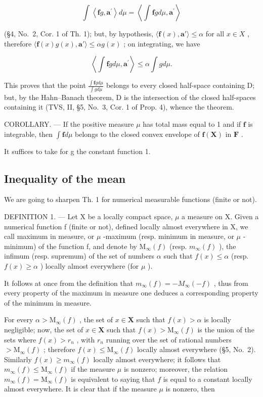 \[
\int \left\langle \mathbf {f} g, \mathbf {a} ^ {\prime} \right\rangle d \mu = \left\langle \int \mathbf {f} g d \mu , \mathbf {a} ^ {\prime} \right\rangle
\]

(§4, No.~2, Cor. 1 of Th. 1); but, by hypothesis, \(\langle \mathbf{f}(x), \mathbf{a}' \rangle \leqslant \alpha\) for all \(x \in X\) , therefore \(\langle \mathbf{f}(x)g(x), \mathbf{a}' \rangle \leqslant \alpha g(x)\) ; on integrating, we have

\[
\left\langle \int \mathbf {f} g d \mu , \mathbf {a} ^ {\prime} \right\rangle \leqslant \alpha \int g d \mu .
\]

This proves that the point \(\frac{\int\mathbf{f}g d\mu}{\int g d\mu}\) belongs to every closed half-space containing D; but, by the Hahn--Banach theorem, D is the intersection of the closed half-spaces containing it (TVS, II, §5, No.~3, Cor. 1 of Prop. 4), whence the theorem.

COROLLARY. --- If the positive measure \(\mu\) has total mass equal to 1 and if \(\mathbf{f}\) is integrable, then \(\int \mathbf{f} d\mu\) belongs to the closed convex envelope of \(\mathbf{f}(\mathbf{X})\) in \(\mathbf{F}\) .

It suffices to take for g the constant function 1.

\subsection{Inequality of the mean}

We are going to sharpen Th. 1 for numerical measurable functions (finite or not).

DEFINITION 1. --- Let X be a locally compact space, \(\mu\) a measure on X. Given a numerical function f (finite or not), defined locally almost everywhere in X, we call maximum in measure, or \(\mu\) -maximum (resp. minimum in measure, or \(\mu\) -minimum) of the function f, and denote by \(\mathrm{M}_{\infty}(f)\) (resp. \(m_{\infty}(f)\) ), the infimum (resp. supremum) of the set of numbers \(\alpha\) such that \(f(x) \leqslant \alpha\) (resp. \(f(x) \geqslant \alpha\) ) locally almost everywhere (for \(\mu\) ).

It follows at once from the definition that \(m_{\infty}(f) = -M_{\infty}(-f)\) , thus from every property of the maximum in measure one deduces a corresponding property of the minimum in measure.

For every \(\alpha > \mathrm{M}_{\infty}(f)\) , the set of \(x \in \mathbf{X}\) such that \(f(x) > \alpha\) is locally negligible; now, the set of \(x \in \mathbf{X}\) such that \(f(x) > \mathrm{M}_{\infty}(f)\) is the union of the sets where \(f(x) > r_n\) , with \(r_n\) running over the set of rational numbers \(> \mathrm{M}_{\infty}(f)\) ; therefore \(f(x) \leqslant \mathrm{M}_{\infty}(f)\) locally almost everywhere (§5, No.~2). Similarly \(f(x) \geqslant m_{\infty}(f)\) locally almost everywhere; it follows that \(m_{\infty}(f) \leqslant \mathrm{M}_{\infty}(f)\) if the measure \(\mu\) is nonzero; moreover, the relation \(m_{\infty}(f) = \mathrm{M}_{\infty}(f)\) is equivalent to saying that \(f\) is equal to a constant locally almost everywhere. It is clear that if the measure \(\mu\) is nonzero, then


